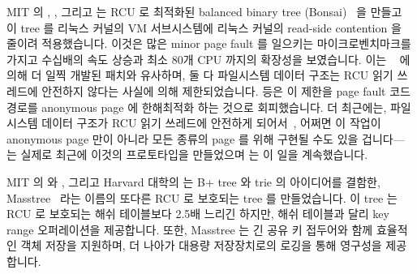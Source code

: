 \fi

MIT 의 , , 그리고
 는 RCU 로 최적화된 balanced binary tree
(Bonsai)~\cite{AustinClements2012RCULinux:mmapsem} 을 만들고 이 tree 를 리눅스
커널의 VM 서브시스템에 리눅스 커널의  read-side contention 을
줄이려 적용했습니다.
이것은 많은 minor page fault 를 일으키는 마이크로벤치마크를 가지고 수십배의
속도 상승과 최소 80개 CPU 까지의 확장성을 보였습니다.
이는
~\cite{PeterZijlstra2014SpeculativePageFault} 에 의해 더
일찍 개발된 패치와 유사하며, 둘 다 파일시스템 데이터 구조는 RCU 읽기 쓰레드에
안전하지 않다는 사실에 의해 제한되었습니다.
 등은 이 제한을 page fault 코드 경로를 anonymous page
에 한해최적화 하는 것으로 회피했습니다.
더 최근에는, 파일시스템 데이터 구조가 RCU 읽기 쓰레드에 안전하게
되어서~\cite{JonathanCorbet2010dcacheRCU,JonathanCorbet2011dcacheRCUbug},
어쩌면 이 작업이 anonymous page 만이 아니라 모든 종류의 page 를 위해 구현될
수도 있을 겁니다--- 는 실제로 최근에 이것의 프로토타입을
만들었으며  는 이 일을 계속했습니다.

\iffalse

\ppl{Austin}{Clements}, \ppl{Frans}{Kaashoek}, and \ppl{Nickolai}{Zeldovich}
of MIT created an RCU-optimized balanced binary tree
(Bonsai)~\cite{AustinClements2012RCULinux:mmapsem}, and applied this
tree to the Linux kernel's VM subsystem in order to reduce read-side
contention on the Linux kernel's \co{mmap_sem}.
This work resulted in order-of-magnitude speedups and scalability up to
at least 80 CPUs for a microbenchmark featuring large numbers of minor
page faults.
This is similar to a patch developed earlier by
\ppl{Peter}{Zijlstra}~\cite{PeterZijlstra2014SpeculativePageFault}, and both
were limited by the fact that, at the time, filesystem data structures
were not safe for RCU readers.
\pplsur{Austin}{Clements} et al.\ avoided this limitation by
optimizing the page-fault
path for anonymous pages only.
More recently, filesystem data structures have been made safe for RCU
readers~\cite{JonathanCorbet2010dcacheRCU,JonathanCorbet2011dcacheRCUbug},
so perhaps this work can be implemented for all page types, not just
anonymous pages---\ppl{Peter}{Zijlstra} has, in fact, recently prototyped
exactly this, and \ppl{Laurent}{Dufour} has continued work along these lines.

\fi

MIT 의  와 , 그리고 Harvard 대학의
 는 B+ tree 와 trie 의 아이디어를 결함한,
Masstree~\cite{Mao:2012:CCF:2168836.2168855} 라는 이름의 또다른 RCU 로 보호되는
tree 를 만들었습니다.
이 tree 는 RCU 로 보호되는 해쉬 테이블보다 2.5배 느리긴 하지만, 해쉬 테이블과
달리 key range 오퍼레이션을 제공합니다.
또한, Masstree 는 긴 공유 키 접두어와 함께 효율적인 객체 저장을 지원하며, 더
나아가 대용량 저장장치로의 로깅을 통해 영구성을 제공합니다.

